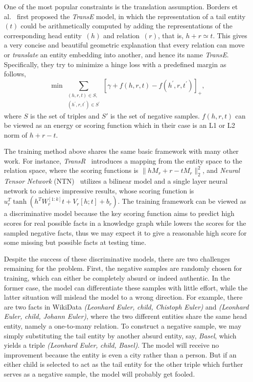 \documentclass[twocolumn,a4paper,10pt,review,3p]{elsarticle}
\begin{document}
One of the most popular constraints is the translation assumption. Borders et al.~\cite{TransE2013} first proposed the \emph{TransE} model, in which the representation of a tail entity~$(t)$ could be arithmetically computed by adding the representations of the corresponding head entity~$(h)$ and relation~$(r)$, that is, $h + r \simeq t$. This gives a very concise and beautiful geometric explanation that every relation can move or \emph{translate} an entity embedding into another, and hence its name \emph{TransE}. Specifically, they try to minimize a hinge loss with a predefined margin as follows,
\[
    \min\sum_{\substack{(h, r, t)\in S,\\ (h^\prime, r, t^\prime)\in S^\prime }}
        {\left[\gamma + f(h, r, t) - f(h^\prime, r, t^\prime)\right]}_+,
\]
where $S$ is the set of triples and $S'$ is the set of negative samples. $f(h, r, t)$ can be viewed as an energy or scoring function which in their case is an L1 or L2 norm of $h + r - t$.

The training method above shares the same basic framework with many other work. For instance, \emph{TransR}~\cite{TransR2015} introduces a mapping from the entity space to the relation space, where the scoring functions is $\parallel h M_r + r - t M_r \parallel_2^2 $, and \emph{Neural Tensor Network} (NTN)~\cite{NTN} utilizes a bilinear model and a single layer neural network to achieve impressive results, whose scoring function is $u_r^T \tanh(h^T W_r^{[1:k]}t + V_r[h;t] + b_r)$. The training framework can be viewed as a discriminative model because the key scoring function aims to predict high scores for real possible facts in a knowledge graph while lowers the scores for the sampled negative facts, thus we may expect it to give a reasonable high score for some missing but possible facts at testing time.

Despite the success of these discriminative models, there are two challenges remaining for the problem. First, the negative samples are randomly chosen for training, which can either be completely absurd or indeed authentic. In the former case, the model can differentiate these samples with little effort, while the latter situation will mislead the model to a wrong direction. For example, there are two facts in WikiData \emph{(Leonhard Euler, child, Chistoph Euler)} and \emph{(Leonhard Euler, child, Johann Euler)}, where the two different entities share the same head entity, namely a one-to-many relation. To construct a negative sample, we may simply substituting the tail entity by another absurd entity, say, \emph{Basel}, which yields a triple \emph{(Leonhard Euler, child, Basel)}. The model will receive no improvement because the entity is even a city rather than a person. But if an either child is selected to act as the tail entity for the other triple which further serves as a negative sample, the model will probably get fooled.
\end{document}
